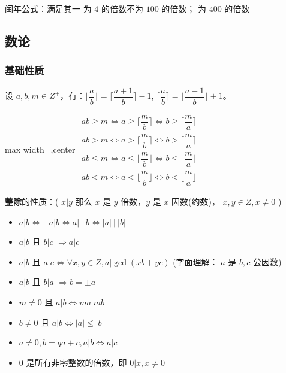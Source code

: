 \documentclass[twocolumn,10pt]{ctexart}
\newcommand{\cds}[1]{\ding{\numexpr191+#1\relax}}
\begin{document}
闰年公式：满足其一 \cds{1} 为 $4$ 的倍数不为 $100$ 的倍数； \cds{2} 为 $400$ 的倍数

\subsection{数论}

\subsubsection{基础性质}

设 $a,b,m\in Z^+$，有：$\lfloor\dfrac ab\rfloor=\lceil\dfrac{a+1}b\rceil-1$, $\lceil\dfrac ab\rceil=\lfloor\dfrac{a-1}b\rfloor+1$。

\begin{adjustbox}{max width=\linewidth,center}
$\begin{aligned}
ab\ge m\Leftrightarrow a\ge\lceil\dfrac mb\rceil \Leftrightarrow b\ge\lceil\dfrac ma\rceil\\
ab > m\Leftrightarrow a > \lceil\dfrac mb\rceil \Leftrightarrow b > \lceil\dfrac ma\rceil\\
ab\le m\Leftrightarrow a\le\lfloor\dfrac mb\rfloor \Leftrightarrow b\le\lfloor\dfrac ma\rfloor\\
ab <  m\Leftrightarrow a < \lfloor\dfrac mb\rfloor\Leftrightarrow b < \lfloor\dfrac ma\rfloor
\end{aligned}$
\end{adjustbox}

\textbf{整除}的性质：( $x|y$ 那么 $x$ 是 $y$ 倍数，$y$ 是 $x$ 因数(约数)， $x,y\in Z,x\neq 0$ )

\begin{itemize}
\item $a|b\Leftrightarrow-a|b\Leftrightarrow a|-b\Leftrightarrow|a|\ |\ |b|$
\item $a|b$ 且 $b|c$ $\Rightarrow a|c$
\item $a|b$ 且 $a|c\Leftrightarrow \forall x,\allowbreak{}y\in Z,\allowbreak{}a|\gcd(xb+yc)$  (字面理解： $a$ 是 $b,c$ 公因数)
\item $a|b$ 且 $b|a$ $\Rightarrow b=\pm a$
\item $m\neq 0$ 且 $a|b\Leftrightarrow ma|mb$
\item $b\neq 0$ 且 $a|b\Leftrightarrow |a|\le |b|$
\item $a\neq 0,\allowbreak{}b=qa+c,\allowbreak{}a|b\Leftrightarrow a|c$
\item $0$ 是所有非零整数的倍数，即 $0|x,x\neq 0$
\end{itemize}
\end{document}
